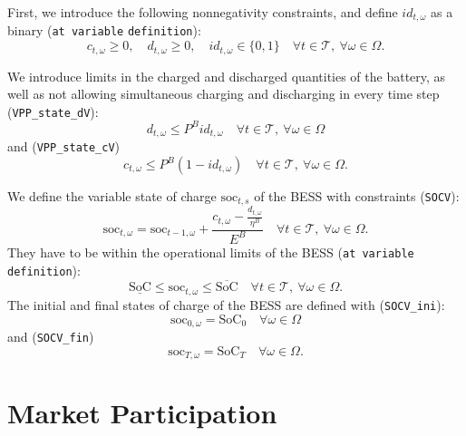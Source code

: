 \documentclass{article}
\newcommand{\SOC}{\text{SoC}}
\newcommand{\soc}{\text{soc}}
\begin{document}
First, we introduce the following nonnegativity  constraints, and define $id_{t, \omega}$ as a binary (\verb|at variable| \verb|definition|):
\begin{equation} \label{dVdCPos}
	c_{t, \omega} \geq 0, \quad d_{t, \omega} \geq 0, \quad id_{t, \omega} \in \{ 0, 1 \} \quad \forall t \in \mathcal{T}, \ \forall \omega \in \Omega.
\end{equation}

We introduce limits in the charged and discharged quantities of the battery, as well as not allowing simultaneous charging and discharging in every time step (\verb|VPP_state_dV|):
\begin{equation} \label{EQ:VPP_state_dV}
	d_{t, \omega} \leq P^B id_{t, \omega} \quad \forall t \in \mathcal{T}, \ \forall \omega \in \Omega
\end{equation}
and (\verb|VPP_state_cV|)
\begin{equation} \label{EQ:VPP_state_cV}
	c_{t, \omega} \leq P^B (1 - id_{t, \omega}) \quad \forall t \in \mathcal{T}, \ \forall \omega \in \Omega.
\end{equation}

We define the variable state of charge $\soc_{t, s}$ of the BESS with constraints (\verb|SOCV|): 
\begin{equation} \label{EQ:SOCV}
	\soc_{t, \omega} = \soc_{t - 1, \omega} + \frac{c_{t, \omega} - \frac{d_{t, \omega}}{\eta^B}}{E^B} \quad \forall t \in \mathcal{T}, \ \forall \omega \in \Omega. 
\end{equation} 
They have to be within the operational limits of the BESS (\verb|at variable definition|):
\begin{equation} \label{EQ:socVOperLimits}
	\underline{\SOC} \leq \soc_{t, \omega} \leq \overline{\SOC} \quad \forall t \in \mathcal{T}, \ \forall \omega \in \Omega.
\end{equation}
The initial and final states of charge of the BESS are defined with (\verb|SOCV_ini|):
\begin{equation} \label{EQ:SOCV_ini}
	\soc_{0, \omega} = \SOC_0 \quad \forall \omega \in \Omega
\end{equation}
and (\verb|SOCV_fin|)
\begin{equation} \label{EQ:SOCV_fin}
	\soc_{T, \omega} = \SOC_T \quad \forall \omega \in \Omega.
\end{equation}



\section{Market Participation}
\label{SEC:MarketParticipation}
\end{document}
